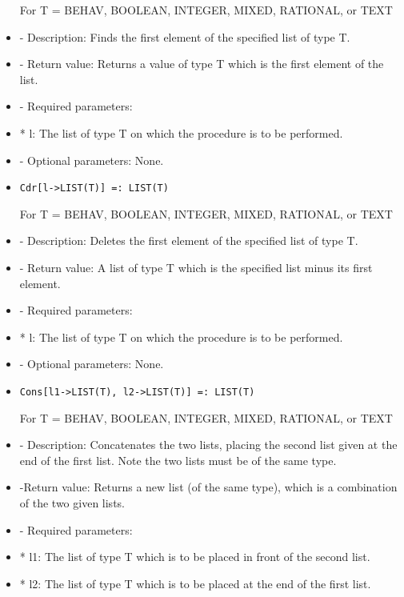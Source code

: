 \begin{itemize}
For T = BEHAV, BOOLEAN, INTEGER, MIXED, RATIONAL, or TEXT 

\bd
\item
- Description:  Finds the first element of the specified list of type T.
\item
- Return value:  Returns a value of type T which is the first element
of the list.
\item - Required parameters:
	
\bd
\item
* l:  The list of type T on which the procedure is to be performed.
\ed

\item
- Optional parameters:  None.
\ed

\item

\begin{verbatim}
Cdr[l->LIST(T)] =: LIST(T)
\end{verbatim}

For T = BEHAV, BOOLEAN, INTEGER, MIXED, RATIONAL, or TEXT

\bd
\item
- Description:  Deletes the first element of the specified list of type T.
\item -	Return value:  A list of type T which is the specified list minus its
first element.
\item   
- Required parameters:

\bd
\item
*  l:  The list of type T on which the procedure is to be performed.
\ed
\item
- Optional parameters:  None.
\ed

\item

\begin{verbatim}
Cons[l1->LIST(T), l2->LIST(T)] =: LIST(T)
\end{verbatim}

For T = BEHAV, BOOLEAN, INTEGER, MIXED, RATIONAL, or TEXT

\bd
\item
- Description:  Concatenates the two lists, placing the second list given
at the end of the first list.  Note the two lists must be of the same type.
\item -Return value:  Returns a new list (of the same type), which is a 
combination of the two given lists.
\item
- Required parameters:

\bd
\item
*  l1:  The list of type T which is to be placed in front of the second list.
\item 
* l2:  The list of type T which is to be placed at the end of the first list.
\ed


\end{itemize}
